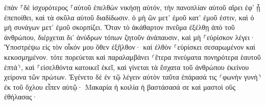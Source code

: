 \documentclass{openreader}
\begin{document}
ἐπὰν ⸀δὲ ἰσχυρότερος ⸀αὐτοῦ ἐπελθὼν νικήσῃ αὐτόν, τὴν πανοπλίαν αὐτοῦ αἴρει ἐφ’ ᾗ ἐπεποίθει, καὶ τὰ σκῦλα αὐτοῦ διαδίδωσιν. 
ὁ μὴ ὢν μετ’ ἐμοῦ κατ’ ἐμοῦ ἐστιν, καὶ ὁ μὴ συνάγων μετ’ ἐμοῦ σκορπίζει. 
Ὅταν τὸ ἀκάθαρτον πνεῦμα ἐξέλθῃ ἀπὸ τοῦ ἀνθρώπου, διέρχεται δι’ ἀνύδρων τόπων ζητοῦν ἀνάπαυσιν, καὶ μὴ ⸀εὑρίσκον λέγει· Ὑποστρέψω εἰς τὸν οἶκόν μου ὅθεν ἐξῆλθον· 
καὶ ἐλθὸν ⸀εὑρίσκει σεσαρωμένον καὶ κεκοσμημένον. 
τότε πορεύεται καὶ παραλαμβάνει ⸂ἕτερα πνεύματα πονηρότερα ἑαυτοῦ ἑπτά⸃, καὶ ⸀εἰσελθόντα κατοικεῖ ἐκεῖ, καὶ γίνεται τὰ ἔσχατα τοῦ ἀνθρώπου ἐκείνου χείρονα τῶν πρώτων. 
Ἐγένετο δὲ ἐν τῷ λέγειν αὐτὸν ταῦτα ἐπάρασά τις ⸂φωνὴν γυνὴ⸃ ἐκ τοῦ ὄχλου εἶπεν αὐτῷ· Μακαρία ἡ κοιλία ἡ βαστάσασά σε καὶ μαστοὶ οὓς ἐθήλασας· 
\end{document}
